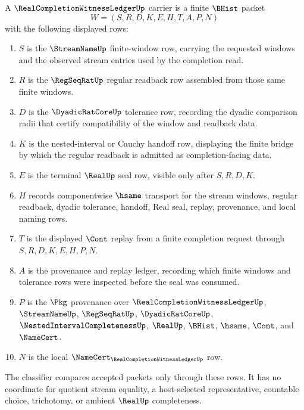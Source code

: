 \begin{definition}
\label{def:real-completion-witness-ledger-carrier}
A $\RealCompletionWitnessLedgerUp$ carrier is a finite $\BHist$ packet
$$
W=(S,R,D,K,E,H,T,A,P,N)
$$
with the following displayed rows:
\begin{enumerate}
\item $S$ is the $\StreamNameUp$ finite-window row, carrying the requested windows and the observed stream entries used by the completion read.
\item $R$ is the $\RegSeqRatUp$ regular readback row assembled from those same finite windows.
\item $D$ is the $\DyadicRatCoreUp$ tolerance row, recording the dyadic comparison radii that certify compatibility of the window and readback data.
\item $K$ is the nested-interval or Cauchy handoff row, displaying the finite bridge by which the regular readback is admitted as completion-facing data.
\item $E$ is the terminal $\RealUp$ seal row, visible only after $S,R,D,K$.
\item $H$ records componentwise $\hsame$ transport for the stream windows, regular readback, dyadic tolerance, handoff, Real seal, replay, provenance, and local naming rows.
\item $T$ is the displayed $\Cont$ replay from a finite completion request through $S,R,D,K,E,H,P,N$.
\item $A$ is the provenance and replay ledger, recording which finite windows and tolerance rows were inspected before the seal was consumed.
\item $P$ is the $\Pkg$ provenance over $\RealCompletionWitnessLedgerUp$, $\StreamNameUp$, $\RegSeqRatUp$, $\DyadicRatCoreUp$, $\NestedIntervalCompletenessUp$, $\RealUp$, $\BHist$, $\hsame$, $\Cont$, and $\NameCert$.
\item $N$ is the local $\NameCert_{\RealCompletionWitnessLedgerUp}$ row.
\end{enumerate}
The classifier compares accepted packets only through these rows. It has no coordinate for quotient stream equality, a host-selected representative, countable choice, trichotomy, or ambient $\RealUp$ completeness.
\end{definition}


